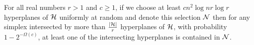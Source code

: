 \begin{lemma}\label{thm:enet}
	For all real numbers $r > 1$ and $c \ge 1$, if we choose at least \(c
	n^2 \log n r \log r \) hyperplanes of \(\mathcal{H}\)
	uniformly at random and denote this selection \(\mathcal{N}\) then for any simplex
	intersected by more than \(\frac{| \mathcal{H} |}{r}\) hyperplanes of \(\mathcal{H}\),
	with probability $1 - 2^{-\Omega(c)}$, at least one of the intersecting
	hyperplanes is contained in \(\mathcal{N}\).
\end{lemma}
